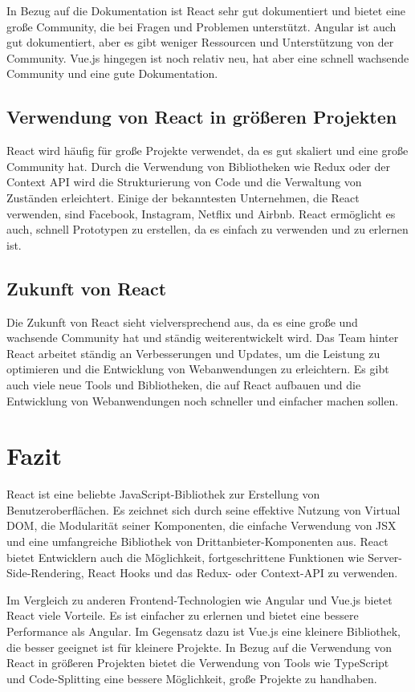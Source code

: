 In Bezug auf die Dokumentation ist React sehr gut dokumentiert und bietet eine große Community, die bei Fragen und Problemen unterstützt. Angular ist auch gut dokumentiert, aber es gibt weniger Ressourcen und Unterstützung von der Community. Vue.js hingegen ist noch relativ neu, hat aber eine schnell wachsende Community und eine gute Dokumentation.

\subsection{Verwendung von React in größeren Projekten}
React wird häufig für große Projekte verwendet, da es gut skaliert und eine große Community hat. Durch die Verwendung von Bibliotheken wie Redux oder der Context API wird die Strukturierung von Code und die Verwaltung von Zuständen erleichtert. Einige der bekanntesten Unternehmen, die React verwenden, sind Facebook, Instagram, Netflix und Airbnb. React ermöglicht es auch, schnell Prototypen zu erstellen, da es einfach zu verwenden und zu erlernen ist.

\subsection{Zukunft von React}
Die Zukunft von React sieht vielversprechend aus, da es eine große und wachsende Community hat und ständig weiterentwickelt wird. Das Team hinter React arbeitet ständig an Verbesserungen und Updates, um die Leistung zu optimieren und die Entwicklung von Webanwendungen zu erleichtern. Es gibt auch viele neue Tools und Bibliotheken, die auf React aufbauen und die Entwicklung von Webanwendungen noch schneller und einfacher machen sollen.

\section{Fazit}
React ist eine beliebte JavaScript-Bibliothek zur Erstellung von Benutzeroberflächen. Es zeichnet sich durch seine effektive Nutzung von Virtual DOM, die Modularität seiner Komponenten, die einfache Verwendung von JSX und eine umfangreiche Bibliothek von Drittanbieter-Komponenten aus. React bietet Entwicklern auch die Möglichkeit, fortgeschrittene Funktionen wie Server-Side-Rendering, React Hooks und das Redux- oder Context-API zu verwenden.

Im Vergleich zu anderen Frontend-Technologien wie Angular und Vue.js bietet React viele Vorteile. Es ist einfacher zu erlernen und bietet eine bessere Performance als Angular. Im Gegensatz dazu ist Vue.js eine kleinere Bibliothek, die besser geeignet ist für kleinere Projekte. In Bezug auf die Verwendung von React in größeren Projekten bietet die Verwendung von Tools wie TypeScript und Code-Splitting eine bessere Möglichkeit, große Projekte zu handhaben.


